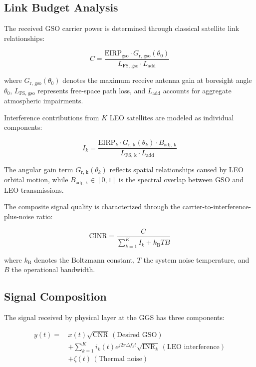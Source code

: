 \documentclass[10pt, conference]{IEEEtran}
\begin{document}
\subsection{Link Budget Analysis}
The received GSO carrier power is determined through classical satellite link relationships:

\begin{equation}
    C = \frac{\text{EIRP}_{\text{gso}} \cdot G_{\text{r, gso}}(\theta_0)}{L_{\text{FS, gso}} \cdot L_{\text{add}}}
    \label{eq:carrier_power}
\end{equation}

where $G_{\text{r, gso}}(\theta_0)$ denotes the maximum receive antenna gain at boresight angle $\theta_0$, $L_{\text{FS, gso}}$ represents free-space path loss, and $L_{\text{add}}$ accounts for aggregate atmospheric impairments.

Interference contributions from $K$ LEO satellites are modeled as individual components:

\begin{equation}
    I_k = \frac{\text{EIRP}_k \cdot G_{\text{r, k}}(\theta_k) \cdot B_{\text{adj, k}}}{L_{\text{FS, k}} \cdot L_{\text{add}}}
    \label{eq:interference_power}
\end{equation}

The angular gain term $G_{\text{r, k}}(\theta_k)$ reflects spatial relationships caused by LEO orbital motion, while $B_{\text{adj, k}} \in [0,1]$ is the spectral overlap between GSO and LEO transmissions.

The composite signal quality is characterized through the carrier-to-interference-plus-noise ratio:

\begin{equation}
    \text{CINR} = \frac{C}{\sum_{k=1}^{K}I_k + k_{\text{B}}TB}
    \label{eq:CINR}
\end{equation}

where $k_{\text{B}}$ denotes the Boltzmann constant, $T$ the system noise temperature, and $B$ the operational bandwidth.

\subsection{Signal Composition}
The signal received by physical layer at the GGS has three components:

\begin{align}
    y(t) =\, & x(t)\sqrt{\text{CNR}}\, (\text{Desired GSO}) \nonumber                                                 \\[0.5em]
             & + \sum_{k=1}^{K} i_k(t)e^{j2\pi \Delta f_k t}\sqrt{\text{INR}_k}\, (\text{LEO interference}) \nonumber \\[0.5em]
             & + \zeta(t)\, (\text{Thermal noise})
\end{align}
\end{document}
